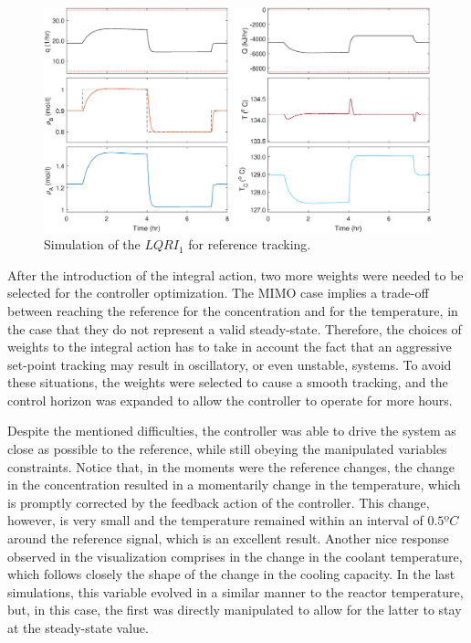 \documentclass[a4paper,11pt]{book}
\numberwithin{figure}{chapter}
\numberwithin{equation}{chapter}
\numberwithin{table}{chapter}
\theoremstyle{definition}
\begin{document}
\begin{figure}[ht] \centering
	\includegraphics[width=\textwidth]{chapter7/lqri01}
	
	\caption{Simulation of the $LQRI_1$ for reference tracking.}
	\label{fig:lqri01}
\end{figure}

After the introduction of the integral action, two more weights were needed to be selected for the controller optimization. The MIMO case implies a trade-off between reaching the reference for the concentration and for the temperature, in the case that they do not represent a valid steady-state. Therefore, the choices of weights to the integral action has to take in account the fact that an aggressive set-point tracking may result in oscillatory, or even unstable, systems. To avoid these situations, the weights were selected to cause a smooth tracking, and the control horizon was expanded to allow the controller to operate for more hours. 

Despite the mentioned difficulties, the controller was able to drive the system as close as possible to the reference, while still obeying the manipulated variables constraints. Notice that, in the moments were the reference changes, the change in the concentration resulted in a momentarily change in the temperature, which is promptly corrected by the feedback action of the controller. This change, however, is very small and the temperature remained within an interval of $0.5ºC$ around the reference signal, which is an excellent result. Another nice response observed in the visualization comprises in the change in the coolant temperature, which follows closely the shape of the change in the cooling capacity. In the last simulations, this variable evolved in a similar manner to the reactor temperature, but, in this case, the first was directly manipulated to allow for the latter to stay at the steady-state value.
\end{document}
